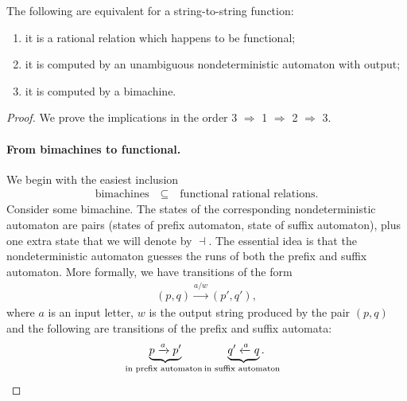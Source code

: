 \begin{theorem}[Eilenberg]\label{thm:bimachines}
    The following are equivalent for a string-to-string function:
    \begin{enumerate}
        \item it is a rational relation which happens to be functional;
        \item it is computed by an unambiguous nondeterministic automaton with output;
        \item it is computed by a bimachine.
    \end{enumerate}
\end{theorem}
\begin{proof}
    We prove the implications in the order 3 $\Rightarrow$ 1 $\Rightarrow$ 2 $\Rightarrow$ 3.

    \paragraph*{From bimachines to functional.}
    We begin with the  easiest inclusion 
    \begin{align*}
    \text{bimachines} \quad \subseteq \quad \text{functional rational relations.}
    \end{align*}
    Consider some bimachine. The states of the corresponding nondeterministic automaton are pairs (states of prefix automaton, state of suffix automaton), plus one extra state that we will denote by $\dashv$. The essential idea is that the nondeterministic automaton guesses the runs of both the prefix and suffix automaton. More formally, we have transitions of the form 
    \begin{align*}
    (p,q) \xrightarrow{ a / w} (p',q'),
    \end{align*}
    where $a$ is an input letter,  $w$ is the output string produced by the pair $(p,q)$ and the following are transitions of the prefix and suffix automata:
    \begin{align*}
      \myunderbrace{p \xrightarrow a p'}{in prefix automaton} \qquad \qquad
      \myunderbrace{q' \xleftarrow a q}{in suffix automaton}.
    \end{align*}

\end{proof}
